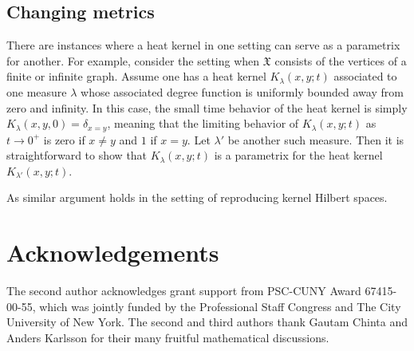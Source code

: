 \documentclass[11pt,reqno]{amsart}
\theoremstyle{remark}
\theoremstyle{definition}
\numberwithin{theorem}{section} \numberwithin{equation}{section}
\newcommand{\X}{\mathfrak{X}}
\begin{document}



\subsection{Changing metrics}

There are instances where a heat kernel in one setting can serve as a parametrix for another.
For example, consider the setting when $\X$ consists of the vertices of a finite or infinite graph.
Assume one has a heat kernel $K_{\lambda}(x,y;t)$ associated to one measure $\lambda$ whose associated
degree function is uniformly bounded away from zero and infinity.  In this case, the small time
behavior of the heat kernel is simply $K_{\lambda}(x,y,0) = \delta_{x=y}$, meaning that the limiting
behavior of $K_{\lambda}(x,y;t)$ as $t \rightarrow 0^{+}$ is zero if $x \neq y$ and $1$ if $x=y$.
Let $\lambda'$ be another such measure.  Then it is straightforward to show that $K_{\lambda}(x,y;t)$
is a parametrix for the heat kernel $K_{\lambda'}(x,y;t)$.

As similar argument holds in the setting of reproducing kernel Hilbert spaces.



\section*{Acknowledgements}
The second author acknowledges grant support from PSC-CUNY Award 67415-00-55, which was jointly funded by the
Professional Staff Congress
and The City University of New York.  The second and third authors thank Gautam Chinta and Anders Karlsson for their many
fruitful mathematical discussions.
\end{document}
